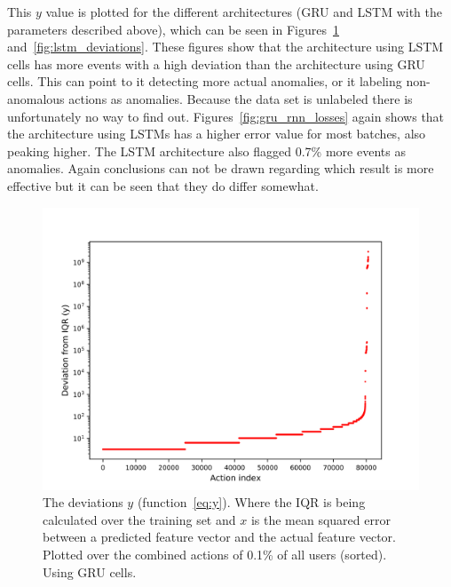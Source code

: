 This \(y\) value is plotted for the different architectures (GRU and LSTM with the parameters described above), which can be seen in Figures~\ref{fig:gru_deviations} and~\ref{fig:lstm_deviations}. These figures show that the architecture using LSTM cells has more events with a high deviation than the architecture using GRU cells. This can point to it detecting more actual anomalies, or it labeling non-anomalous actions as anomalies. Because the data set is unlabeled there is unfortunately no way to find out. Figures~\ref{fig:gru_rnn_losses} again shows that the architecture using LSTMs has a higher error value for most batches, also peaking higher. The LSTM architecture also flagged 0.7\% more events as anomalies. Again conclusions can not be drawn regarding which result is more effective but it can be seen that they do differ somewhat.

\begin{figure}
	\begin{center}
		\includegraphics[scale=6.0]{experiments/cell/deviations/gru}
	\end{center}
	\caption{The deviations \(y\) (function~\ref{eq:y}). Where the IQR is being calculated over the training set and \(x\) is the mean squared error between a predicted feature vector and the actual feature vector. Plotted over the combined actions of 0.1\% of all users (sorted). Using GRU cells.~\label{fig:gru_deviations}}
\end{figure}

